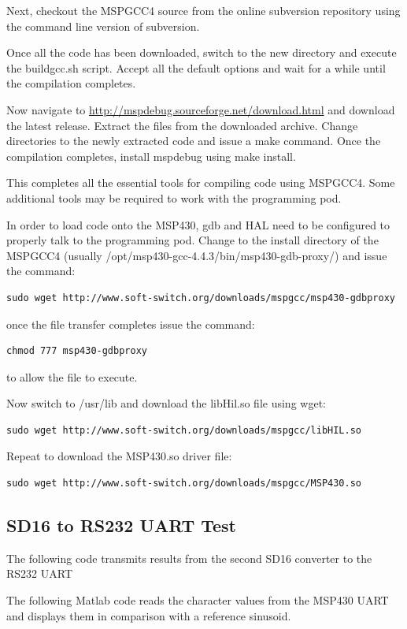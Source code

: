 Next, checkout the MSPGCC4 source from the online subversion repository using the command line version of subversion.

Once all the code has been downloaded, switch to the new directory and execute the buildgcc.sh script. Accept all the default options and wait for a while until the compilation completes.

Now navigate to \url{http://mspdebug.sourceforge.net/download.html} and download the latest release. Extract the files from the downloaded archive. Change directories to the newly extracted code and issue a make command. Once the compilation completes, install mspdebug using make install.

This completes all the essential tools for compiling code using MSPGCC4. Some additional tools may be required to work with the programming pod.

In order to load code onto the MSP430, gdb and HAL need to be configured to properly talk to the programming pod. Change to the install directory of the MSPGCC4 (usually /opt/msp430-gcc-4.4.3/bin/msp430-gdb-proxy/) and issue the command:
\begin{lstlisting}
sudo wget http://www.soft-switch.org/downloads/mspgcc/msp430-gdbproxy
\end{lstlisting}
 once the file transfer completes issue the command:
\begin{lstlisting}
chmod 777 msp430-gdbproxy 
\end{lstlisting}
to allow the file to execute.

Now switch to /usr/lib and download the libHil.so file using wget:
\begin{lstlisting}
sudo wget http://www.soft-switch.org/downloads/mspgcc/libHIL.so
\end{lstlisting}
Repeat to download the MSP430.so driver file:
\begin{lstlisting}
sudo wget http://www.soft-switch.org/downloads/mspgcc/MSP430.so
\end{lstlisting}

\subsection{SD16 to RS232 UART Test}\label{sec:sd16_to_uart}
The following code transmits results from the second SD16 converter to the RS232 \ac{UART}

The following Matlab code reads the character values from the MSP430 \ac{UART} and displays them in comparison with a reference sinusoid.

